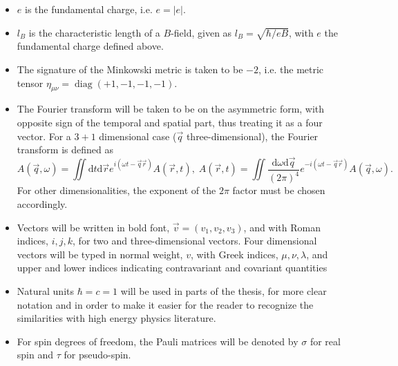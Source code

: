 \begin{itemize}
\item $e$ is the fundamental charge, i.e. $e = |e|$.
\item $l_B$ is the characteristic length of a $B$-field, given as $l_B= \sqrt{\hbar /eB}$, with $e$ the fundamental charge defined above.
\item The signature of the Minkowski metric is taken to be $-2$, i.e. the metric tensor $\eta _{\mu \nu } = \operatorname{diag} (+1, -1,-1,-1)$.
\item The Fourier transform will be taken to be on the asymmetric form, with opposite sign of the temporal and spatial part, thus treating it as a four vector.
  For a $3+1$ dimensional case ($\vec{q}$ three-dimensional), the Fourier transform is defined as
  \begin{equation}
    \label{eq:define-fourier}
    A(\vec{q}, \omega )\! =\!\!
    \iint \mathrm{d}t \mathrm{d} \vec{r}
    e^{i(\omega  t - \vec{q} \vec{r} )}
    A(\vec{r}, t),
    \;
    A(\vec{r}, t) =\!\!
    \iint 
    \frac{\mathrm{d}\omega  \mathrm{d} \vec{q}}{(2\pi )^4}
    e^{-i(\omega  t - \vec{q} \vec{r} )}
    A(\vec{q}, \omega).
  \end{equation}
  For other dimensionalities, the exponent of the $2\pi $ factor must be chosen accordingly.

\item Vectors will be written in bold font, $\vec{v} = (v_1, v_2, v_3)$, and with Roman indices, $i, j, k$, for two and three-dimensional vectors.
  Four dimensional vectors will be typed in normal weight, $v$, with Greek indices, $\mu ,  \nu , \lambda $, and upper and lower indices indicating contravariant and covariant quantities
\item Natural units \( \hbar = c = 1 \) will be used in parts of the thesis, for more clear notation and in order to make it easier for the reader to recognize the similarities with high energy physics literature.
\item For spin degrees of freedom, the Pauli matrices
  will be denoted by $\sigma $ for real spin and $\tau $ for pseudo-spin.
  

\end{itemize}

